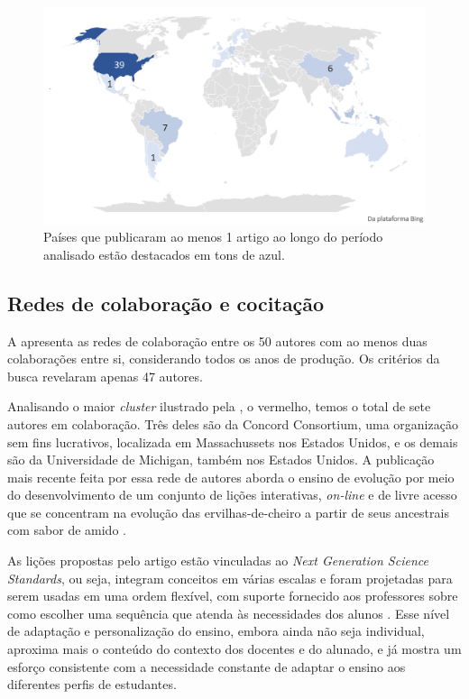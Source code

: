 \documentclass[portuguese]{textolivre}
\begin{document}
\begin{figure}[h!]
    \centering
    \includegraphics[width=0.8\linewidth]{Fig4.png}
    \caption{Países que publicaram ao menos 1 artigo ao longo do período analisado estão destacados em tons de azul.}
    \label{fig4}
\end{figure}

\subsection{Redes de colaboração e cocitação}

A  apresenta as redes de colaboração entre os 50 autores com ao menos duas colaborações entre si, considerando todos os anos de produção. Os critérios da busca revelaram apenas 47 autores.

Analisando o maior \textit{cluster} ilustrado pela , o vermelho, temos o total de sete autores em colaboração. Três deles são da Concord Consortium, uma organização sem fins lucrativos, localizada em Massachussets nos Estados Unidos, e os demais são da Universidade de Michigan, também nos Estados Unidos. A publicação mais recente feita por essa rede de autores aborda o ensino de evolução por meio do desenvolvimento de um conjunto de lições interativas, \textit{on-line} e de livre acesso que se concentram na evolução das ervilhas-de-cheiro a partir de seus ancestrais com sabor de amido \cite{ellis_connected_2023}.

As lições propostas pelo artigo estão vinculadas ao \textit{Next Generation Science Standards}, ou seja, integram conceitos em várias escalas e foram projetadas para serem usadas em uma ordem flexível, com suporte fornecido aos professores sobre como escolher uma sequência que atenda às necessidades dos alunos \cite{ellis_connected_2023}. Esse nível de adaptação e personalização do ensino, embora ainda não seja individual, aproxima mais o conteúdo do contexto dos docentes e do alunado, e já mostra um esforço consistente com a necessidade constante de adaptar o ensino aos diferentes perfis de estudantes.
\end{document}
